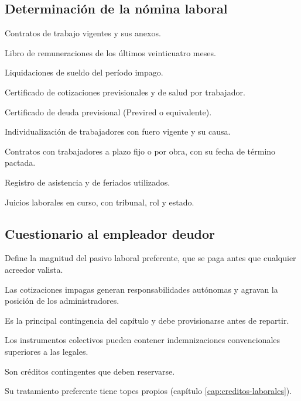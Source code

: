 \bloquePractico

\subsection{Determinación de la nómina laboral}

\begin{checklist}
  \item Contratos de trabajo vigentes y sus anexos.
  \item Libro de remuneraciones de los últimos veinticuatro meses.
  \item Liquidaciones de sueldo del período impago.
  \item Certificado de cotizaciones previsionales y de salud por trabajador.
  \item Certificado de deuda previsional (Previred o equivalente).
  \item Individualización de trabajadores con fuero vigente y su causa.
  \item Contratos con trabajadores a plazo fijo o por obra, con su fecha de término
  pactada.
  \item Registro de asistencia y de feriados utilizados.
  \item Juicios laborales en curso, con tribunal, rol y estado.
\end{checklist}

\subsection{Cuestionario al empleador deudor}

\begin{cuestionario}
  {Define la magnitud del pasivo laboral preferente, que se paga antes que cualquier
  acreedor valista.}

  {Las cotizaciones impagas generan responsabilidades autónomas y agravan la posición de
  los administradores.}

  {Es la principal contingencia del capítulo y debe provisionarse antes de repartir.}

  {Los instrumentos colectivos pueden contener indemnizaciones convencionales superiores
  a las legales.}

  {Son créditos contingentes que deben reservarse.}

  {Su tratamiento preferente tiene topes propios (capítulo \ref{cap:creditos-laborales}).}
\end{cuestionario}

